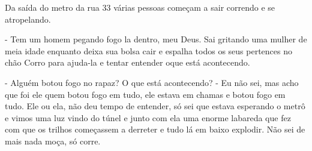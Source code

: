 Da saída do metro da rua 33 várias pessoas começam a sair correndo e se atropelando.

- Tem um homem pegando fogo la dentro, meu Deus. Sai gritando uma mulher de meia idade enquanto deixa sua bolsa cair e espalha todos os seus pertences no chão
Corro para ajuda-la e tentar entender oque está acontecendo.

- Alguém botou fogo no rapaz? O que está acontecendo?
- Eu não sei, mas acho que foi ele quem botou fogo em tudo, ele estava em chamas e botou fogo em tudo. Ele ou ela, não deu tempo de entender, só sei que estava esperando o metrô e vimos uma luz vindo do túnel e junto com ela uma enorme labareda que fez com que os trilhos começassem a derreter e tudo lá em baixo explodir. Não sei de mais nada moça, só corre.